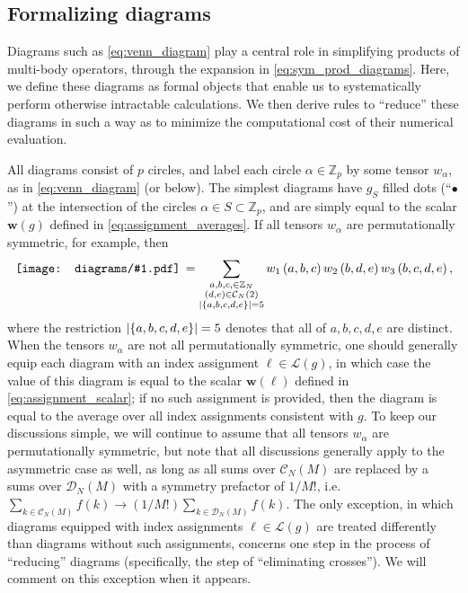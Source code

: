 \documentclass[nofootinbib,notitlepage,11pt]{revtex4-2}
\newcommand{\p}[1]{\left(#1\right)} %
\renewcommand{\set}[1]{\left\{#1\right\}} %
\newcommand{\m}{\bm} %
\newcommand{\1}{\mathds{1}}
\newcommand{\C}{\mathcal{C}}
\newcommand{\D}{\mathcal{D}}
\renewcommand{\L}{\mathcal{L}}
\newcommand{\ZZ}{\mathbb{Z}}
\newcommand{\diagram}[1]
{\,\texttt{[image: diagrams/\#1.pdf]}\,}
\begin{document}
\subsection{Formalizing diagrams}
\label{sec:diagrams}

Diagrams such as \eqref{eq:venn_diagram} play a central role in
simplifying products of multi-body operators, through the expansion in
\eqref{eq:sym_prod_diagrams}.  Here, we define these diagrams as
formal objects that enable us to systematically perform otherwise
intractable calculations.  We then derive rules to ``reduce'' these
diagrams in such a way as to minimize the computational cost of their
numerical evaluation.

All diagrams consist of $p$ circles, and label each circle
$\alpha\in\ZZ_p$ by some tensor $w_\alpha$, as in
\eqref{eq:venn_diagram} (or below).  The simplest diagrams have $g_S$
filled dots (``$\bullet$'') at the intersection of the circles
$\alpha\in S\subset\ZZ_p$, and are simply equal to the scalar
$\m w\p{g}$ defined in \eqref{eq:assignment_averages}.  If all tensors
$w_\alpha$ are permutationally symmetric, for example, then
\begin{align}
  \diagram{example_123}
  = \sum_{\substack{a,b,c,\in\ZZ_N\\\p{d,e}\in\C_N\p{2}\\
      \abs{\set{a,b,c,d,e}}=5}}
  w_1\p{a,b,c} w_2\p{b,d,e} w_3\p{b,c,d,e},
  \label{eq:example_123}
\end{align}
where the restriction $\abs{\set{a,b,c,d,e}}=5$ denotes that all of
$a,b,c,d,e$ are distinct.  When the tensors $w_\alpha$ are not all
permutationally symmetric, one should generally equip each diagram
with an index assignment $\ell\in\L\p{g}$, in which case the value of
this diagram is equal to the scalar $\m w\p{\ell}$ defined in
\eqref{eq:assignment_scalar}; if no such assignment is provided, then
the diagram is equal to the average over all index assignments
consistent with $g$.  To keep our discussions simple, we will continue
to assume that all tensors $w_\alpha$ are permutationally symmetric,
but note that all discussions generally apply to the asymmetric case
as well, as long as all sums over $\C_N\p{M}$ are replaced by a sums
over $\D_N\p{M}$ with a symmetry prefactor of $1/M!$,
i.e.~$\sum_{k\in\C_N\p{M}}f\p{k} \to
\p{1/M!}\sum_{k\in\D_N\p{M}}f\p{k}$.  The only exception, in which
diagrams equipped with index assignments $\ell\in\L\p{g}$ are treated
differently than diagrams without such assignments, concerns one step
in the process of ``reducing'' diagrams (specifically, the step of
``eliminating crosses'').  We will comment on this exception when it
appears.
\end{document}
